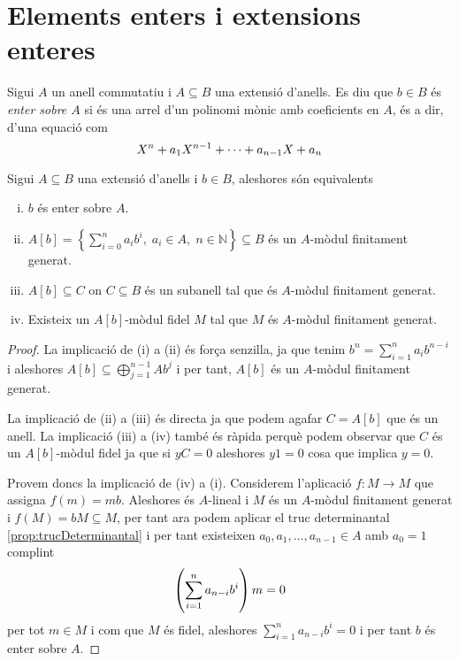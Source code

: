 \documentclass[../../../main.tex]{subfiles}
\begin{document}
\section{Elements enters i extensions enteres} 

\begin{defi}\label{def:enter}\label{def:enterSobreA}
Sigui $A$ un anell commutatiu i $A\subseteq B$ una extensió d'anells. Es diu que $b\in B$ és \textit{enter sobre $A$} si és una arrel d'un polinomi mònic amb coeficients en $A$, és a dir, d'una equació com
\begin{equation}
    \notag
    X^n+a_1X^{n-1}+\cdots+a_{n-1}X+a_n
\end{equation}
\end{defi}


\begin{prop}
\label{prop:enterSobreA} Sigui $A\subseteq B$ una extensió d'anells i $b\in B$, aleshores són equivalents
\begin{enumerate}[(i)]
    \item $b$ és enter sobre $A$.
    \item $A[b] = \left\{\sum_{i=0}^n a_ib^{i},\;a_i\in A,\;n\in\mathbb{N}\right\}\subseteq B$ és un $A$-mòdul finitament generat.
    \item $A[b]\subseteq C$ on $C\subseteq B$ és un subanell tal que és $A$-mòdul finitament generat.
    \item Existeix un $A[b]$-mòdul fidel $M$ tal que $M$ és $A$-mòdul finitament generat.
\end{enumerate}
\end{prop}
\begin{proof}
La implicació de (i) a (ii) és força senzilla, ja que tenim $b^n = \sum_{i=1}^na_ib^{n-i}$ i aleshores $A[b]\subseteq \bigoplus_{j=1}^{n-1}Ab^j$ i per tant, $A[b]$ és un $A$-mòdul finitament generat.

La implicació de (ii) a (iii) és directa ja que podem agafar $C = A[b]$ que és un anell. La implicació (iii) a (iv) també és ràpida perquè podem observar que $C$ és un $A[b]$-mòdul fidel ja que si $yC = 0$ aleshores $y1 = 0$ cosa que implica $y = 0$.

Provem doncs la implicació de (iv) a (i). Considerem l'aplicació $f:M\to M$ que assigna $f(m) = mb$. Aleshores és $A$-lineal i $M$ és un $A$-mòdul finitament generat i $f(M)= bM\subseteq M$, per tant ara podem aplicar el truc determinantal \ref{prop:trucDeterminantal} i per tant existeixen $a_0,a_1,\ldots,a_{n-1}\in A$ amb $a_0 = 1$ complint
\begin{equation}
    \notag
    \left(\sum_{i=1}^na_{n-i}b^{i}\right)m = 0
\end{equation}
per tot $m\in M$ i com que $M$ és fidel, aleshores $\sum_{i=1}^n a_{n-i}b^{i} = 0$ i per tant $b$ és enter sobre $A$.
\end{proof}
\end{document}
